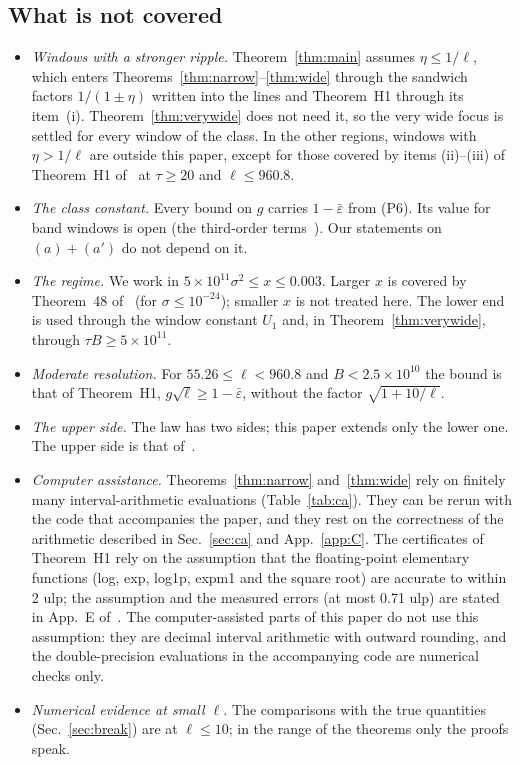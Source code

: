 \subsection{What is not covered}

\begin{itemize}
\item \emph{Windows with a stronger ripple.} Theorem~\ref{thm:main} assumes $\eta\le1/\ell$, which enters Theorems~\ref{thm:narrow}--\ref{thm:wide} through the sandwich factors $1/(1\pm\eta)$ written into the lines and Theorem~H1 through its item~(i). Theorem~\ref{thm:verywide} does not need it, so the very wide focus is settled for every window of the class. In the other regions, windows with $\eta>1/\ell$ are outside this paper, except for those covered by items (ii)--(iii) of Theorem~H1 of~\cite{H} at $\tau\ge20$ and $\ell\le960.8$.
\item \emph{The class constant.} Every bound on $g$ carries $1-\bar\varepsilon$ from (P6). Its value for band windows is open (the third-order terms~\cite{H}). Our statements on $(a)+(a')$ do not depend on it.
\item \emph{The regime.} We work in $5\times10^{11}\sigma^2\le x\le0.003$. Larger $x$ is covered by Theorem~48 of~\cite{F} (for $\sigma\le10^{-24}$); smaller $x$ is not treated here. The lower end is used through the window constant $U_1$ and, in Theorem~\ref{thm:verywide}, through $\tau B\ge5\times10^{11}$.
\item \emph{Moderate resolution.} For $55.26\le\ell<960.8$ and $B<2.5\times10^{10}$ the bound is that of Theorem~H1, $g\sqrt\ell\ge1-\bar\varepsilon$, without the factor $\sqrt{1+10/\ell}$.
\item \emph{The upper side.} The law has two sides; this paper extends only the lower one. The upper side is that of~\cite{F}.
\item \emph{Computer assistance.} Theorems~\ref{thm:narrow} and~\ref{thm:wide} rely on finitely many interval-arithmetic evaluations (Table~\ref{tab:ca}). They can be rerun with the code that accompanies the paper, and they rest on the correctness of the arithmetic described in Sec.~\ref{sec:ca} and App.~\ref{app:C}. The certificates of Theorem~H1 rely on the assumption that the floating-point elementary functions (log, exp, log1p, expm1 and the square root) are accurate to within 2 ulp; the assumption and the measured errors (at most 0.71 ulp) are stated in App.~E of~\cite{H}. The computer-assisted parts of this paper do not use this assumption: they are decimal interval arithmetic with outward rounding, and the double-precision evaluations in the accompanying code are numerical checks only.
\item \emph{Numerical evidence at small $\ell$.} The comparisons with the true quantities (Sec.~\ref{sec:break}) are at $\ell\le10$; in the range of the theorems only the proofs speak.
\end{itemize}

